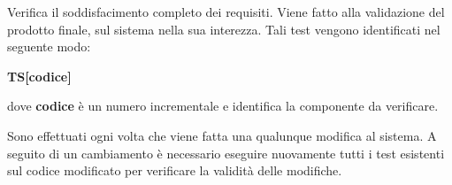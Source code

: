             Verifica il soddisfacimento completo dei requisiti. Viene fatto alla validazione del prodotto finale, sul sistema nella sua interezza.
            Tali test vengono identificati nel seguente modo:
                \begin{center}\textbf{TS[codice]}\end{center}
            dove \textbf{codice} è un numero incrementale e identifica la componente da verificare.

            Sono effettuati ogni volta che viene fatta una qualunque modifica al sistema. A seguito di un cambiamento è necessario eseguire nuovamente tutti i test esistenti sul codice modificato per verificare la validità delle modifiche.
            

